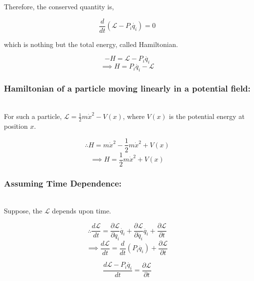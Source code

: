 \documentclass[a4paper]{article}
\newcommand{\Lagr}{\mathcal{L}}
\newcommand{\ddt}{\frac{d}{dt}}
\newcommand{\ddtf}[1]{\frac{d #1}{dt}}
\newcommand{\pdt}[2]{\frac{\partial #1}{\partial #2}}
\newcommand{\half}{\frac{1}{2}}
\begin{document}
			Therefore, the conserved quantity is,

			\begin{equation}
				\ddt(\Lagr - P_i \dot{q_i}) = 0
			\end{equation}

			which is nothing but the total energy, called Hamiltonian.

			$$ -H = \Lagr - P_i \dot{q_i} $$
			\begin{equation}
				\implies H = P_i \dot{q_i} - \Lagr
			\end{equation}


			\subsubsection*{Hamiltonian of a particle moving linearly in a potential field: }
				\noindent \\

				For such a particle, $\Lagr = \half m \dot{x}^2 - V(x)$, where $V(x)$ is the potential energy at position $x$.

				$$ \therefore H = m\dot{x}^2 - \half m \dot{x}^2 + V(x) $$
				$$ \implies H = \half m \dot{x}^2 + V(x) $$

			\subsubsection*{Assuming Time Dependence: }
				\noindent \\

				Suppose, the $\Lagr$ depends upon time.





				$$ \therefore \ddtf{\Lagr} = \pdt{\Lagr}{q_i}\dot{q_i} + \pdt{\Lagr}{\dot{q_i}}\ddot{q_i} + \pdt{\Lagr}{t} $$
				$$ \implies \ddtf{\Lagr} = \ddt(P_i \dot{q_i}) + \pdt{\Lagr}{t} $$

				$$ \ddtf{\Lagr - P_i \dot{q_i}} = \pdt{\Lagr}{t} $$
\end{document}
